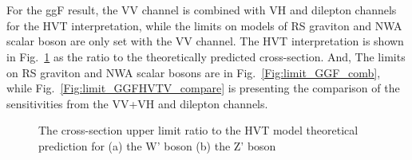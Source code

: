 \noindent
\\
\\For the ggF result, the VV channel is combined with VH and dilepton channels for the HVT interpretation, while the limits on models of RS graviton and NWA scalar boson are only set with the VV channel. The HVT interpretation is shown in Fig.~\ref{Fig:limit_GGFHVT_comb} as the ratio to the theoretically predicted cross-section. And, The limits on RS graviton and NWA scalar bosons are in Fig.~\ref{Fig:limit_GGF_comb}, while Fig.~\ref{Fig:limit_GGFHVTV_compare} is presenting the comparison of the sensitivities from the VV+VH and dilepton channels. 
\begin{figure}[ht]
	\centering
	\caption{The cross-section upper limit ratio to the HVT model theoretical prediction for (a) the W' boson (b) the Z' boson }
	\label{Fig:limit_GGFHVT_comb}
\end{figure}
